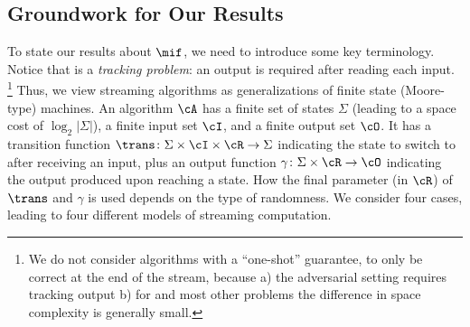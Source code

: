 \subsection{Groundwork for Our Results}\label{subsec:models}

To state our results about $\mif$, we need to introduce some key terminology.
Notice that \mif is a {\em tracking problem}: an output is required after
reading each input.%
%
\footnote{We do not consider algorithms with a ``one-shot'' guarantee, to only
be correct at the end of the stream, because a) the adversarial setting
requires tracking output b) for \mif and most other problems the difference
in space complexity is generally small.} 
%
Thus, we view streaming algorithms as generalizations of finite state
(Moore-type) machines. An algorithm $\cA$ has a finite set of states $\Sigma$
(leading to a space cost of $\log_2|\Sigma|$), a finite input set $\cI$, and a
finite output set $\cO$.  It has a transition function $\trans \colon \Sigma
\times \cI \times \cR \to \Sigma$ indicating the state to switch to after
receiving an input, plus an output function $\gamma \colon \Sigma \times \cR
\to \cO$ indicating the output produced upon reaching a state. How the final
parameter (in $\cR$) of $\trans$ and $\gamma$ is used depends on the type of
randomness. We consider four cases, leading to four different models of
streaming computation.

